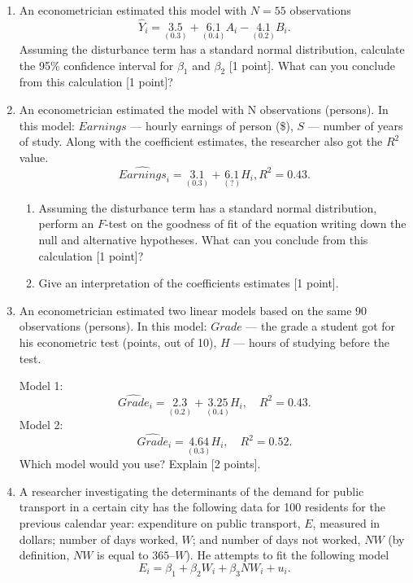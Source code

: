 \begin{enumerate}

\item An econometrician estimated this model with $N=55$ observations
\[
\hat{Y}_i = \underset{(0.3)}{3.5} + \underset{(0.4)}{6.1} A_i - \underset{(0.2)}{4.1} B_i. 
\]
Assuming the disturbance term has a standard normal distribution, calculate the 95\%
confidence interval for $\beta_1$ and $\beta_2$ [1 point].
What can you conclude from this calculation [1 point]?


\item An econometrician estimated the model with N observations (persons). In this model: $Earnings$
— hourly earnings of person (\$), $S$ — number of years of study. 
Along with the coefficient estimates, the researcher also got the $R^2$ value.
\[
\widehat{Earnings}_i = \underset{(0.3)}{3.1} + \underset{(?)}{6.1} H_i, R^2= 0.43. 
\]

\begin{enumerate}
    \item Assuming the disturbance term has a standard normal distribution, perform an $F$-test on the
    goodness of fit of the equation writing down the null and alternative hypotheses. What can you
    conclude from this calculation [1 point]?
\item  Give an interpretation of the coefficients estimates [1 point].
\end{enumerate}


\item An econometrician estimated two linear models based on the same 90 observations (persons). In
this model: $Grade$ — the grade a student got for his econometric test (points, out of 10), $H$ — hours
of studying before the test.

Model 1:
\[
\widehat{Grade}_i = \underset{(0.2)}{2.3} + \underset{(0.4)}{3.25} H_i, \quad R^2= 0.43. 
\]
Model 2:
\[
\widehat{Grade}_i = \underset{(0.3)}{4.64} H_i, \quad R^2= 0.52. 
\]
Which model would you use? Explain [2 points].


\item A researcher investigating the determinants of the demand for public transport in a certain city has
the following data for 100 residents for the previous calendar year: expenditure on public transport,
$E$, measured in dollars; number of days worked, $W$; and number of days not worked, $NW$ (by
definition, $NW$ is equal to $365 – W$). He attempts to fit the following model
\[
E_i = \beta_1 + \beta_2 W_i + \beta_3 NW_i + u_i.    
\]


\end{enumerate}
